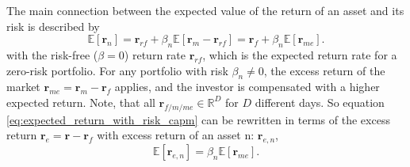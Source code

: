 The main connection between the expected value of the return of an asset and its risk is described by
\begin{equation}%
	\mathbb{E}[\bm{r}_n] = \bm{r}_{rf} + \beta_n\mathbb{E}[\bm{r}_{m} - \bm{r}_{rf}] = \bm{r}_f + \beta_n\mathbb{E}[\bm{r}_{me}]. 
\label{eq:expected_return_with_risk_capm}
\end{equation}
with the risk-free ($\beta=0$) return rate $\bm{r}_{rf}$, which is the expected return rate for a zero-risk portfolio. For any portfolio with risk $\beta_n \neq 0$, the excess return of the market $\bm{r}_{me} = \bm{r}_m - \bm{r}_f$ applies, and the investor is compensated with a higher expected return. Note, that all $\bm{r}_{f/m/me} \in \mathbb{R}^D$ for $D$ different days. So equation \ref{eq:expected_return_with_risk_capm} can be rewritten in terms of the excess return $\bm{r}_e = \bm{r} - \bm{r}_f$ with excess return of an asset n: $\bm{r}_{e,n}$,
\begin{equation}%
	\mathbb{E}[\bm{r}_{e,n}] = \beta_n\mathbb{E}[\bm{r}_{me}].
\label{eq: excess return}
\end{equation}


